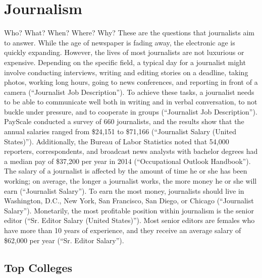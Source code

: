 \chapter{Journalism}
\begin{multicols}{2}

Who? What? When? Where? Why? These are the questions that journalists aim to answer. While the age of newspaper is fading away, the electronic age is quickly expanding. However, the lives of most journalists are not luxurious or expensive. Depending on the specific field, a typical day for a journalist might involve conducting interviews, writing and editing stories on a deadline, taking photos, working long hours, going to news conferences, and reporting in front of a camera (“Journalist Job Description”). To achieve these tasks, a journalist needs to be able to communicate well both in writing and in verbal conversation, to not buckle under pressure, and to cooperate in groups (“Journalist Job Description”). PayScale conducted a survey of 660 journalists, and the results show that the annual salaries ranged from \$24,151 to \$71,166 (“Journalist Salary (United States)”). Additionally, the Bureau of Labor Statistics noted that 54,000 reporters, correspondents, and broadcast news analysts with bachelor degrees had a median pay of \$37,200 per year in 2014 (“Occupational Outlook Handbook”). The salary of a journalist is affected by the amount of time he or she has been working; on average, the longer a journalist works, the more money he or she will earn (“Journalist Salary”). To earn the most money, journalists should live in Washington, D.C., New York, San Francisco, San Diego, or Chicago (“Journalist Salary”). Monetarily, the most profitable position within journalism is the senior editor (“Sr. Editor Salary (United States)”). Most senior editors are females who have more than 10 years of experience, and they receive an average salary of \$62,000 per year (“Sr. Editor Salary”).  

\end{multicols}

\section{Top Colleges}

